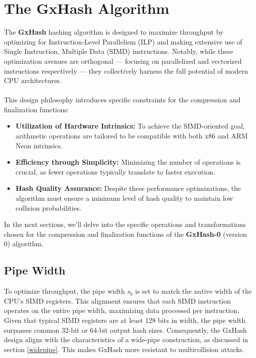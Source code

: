 \documentclass[10pt]{article}
\begin{document}
\clearpage
\section{The GxHash Algorithm}

The \textbf{GxHash} hashing algorithm is designed to maximize throughput by optimizing for Instruction-Level Parallelism (ILP) and making extensive use of Single Instruction, Multiple Data (SIMD) instructions. Notably, while these optimization avenues are orthogonal — focusing on parallelized and vectorized instructions respectively — they collectively harness the full potential of modern CPU architectures.\\\\
This design philosophy introduces specific constraints for the compression and finalization functions:

\begin{itemize}
    \item \textbf{Utilization of Hardware Intrinsics:} To achieve the SIMD-oriented goal, arithmetic operations are tailored to be compatible with both x86 and ARM Neon intrinsics.
    \item \textbf{Efficiency through Simplicity:} Minimizing the number of operations is crucial, as fewer operations typically translate to faster execution.
    \item \textbf{Hash Quality Assurance:} Despite these performance optimizations, the algorithm must ensure a minimum level of hash quality to maintain low collision probabilities.
\end{itemize}

In the next sections, we'll delve into the specific operations and transformations chosen for the compression and finalization functions of the \textbf{GxHash-0} (version 0) algorithm.

\subsection{Pipe Width}

To optimize throughput, the pipe width \( s_b \) is set to match the native width of the CPU's SIMD registers.
This alignment ensures that each SIMD instruction operates on the entire pipe width, maximizing data processed per instruction.
Given that typical SIMD registers are at least 128 bits in width, the pipe width surpasses common 32-bit or 64-bit output hash sizes.
Consequently, the GxHash design aligns with the characteristics of a wide-pipe construction, as discussed in section \ref{widepipe}.
This makes GxHash more resistant to multicollision attacks.
\end{document}
